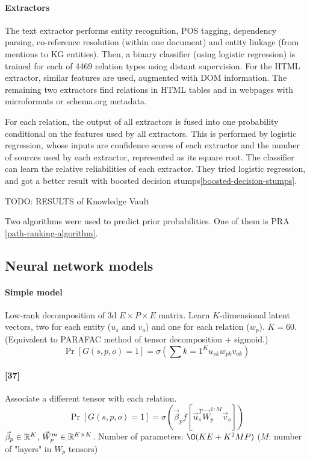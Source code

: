 \paragraph{Extractors}
The text extractor performs entity recognition, POS tagging, dependency parsing,
co-reference resolution (within one document) and entity linkage (from mentions
to KG entities).
Then, a binary classifier (using logistic regression) is trained for each of
4469 relation types using distant supervision.
For the HTML extractor, similar features are used, augmented with DOM
information.
The remaining two extractors find relations in HTML tables and in webpages
with microformats or schema.org metadata.

For each relation, the output of all extractors is fused into one probability
conditional on the features used by all extractors. This is performed by
logistic regression, whose inputs are confidence scores of each extractor and
the number of sources used by each extractor, represented as its square root.
The classifier can learn the relative reliabilities of each extractor.
They tried logistic regression, and got a better result with boosted decision
stumps\ref{boosted-decision-stumps}.

TODO: RESULTS of Knowledge Vault

Two algorithms were used to predict prior probabilities.
One of them is PRA \ref{path-ranking-algorithm}.

\subsection{Neural network models}

\paragraph{Simple model}
Low-rank decomposition of 3d $E\times P\times E$ matrix. Learn $K$-dimensional
latent vectors, two for each entity ($u_s$ and $v_o$) and one for each relation
($w_p$). $K=60$. (Equivalent to PARAFAC method of tensor decomposition +
sigmoid.)
$$\Pr[G(s,p,o)=1] = \sigma(\sum\limits{k=1}^K u_{sk} w_{pk} v_{ok})$$

\paragraph{[37]}
Associate a different tensor with each relation.
$$\Pr[G(s,p,o)=1] = \sigma(\vec{\beta}_p f[\vec{u}_s^T \vec{W}_p^{1:M} \vec{v}_o])$$
$\vec{\beta}_p\in\mathbb{R}^K$, $\vec{W}_p^m\in\mathbb{R}^{K\times K}$.
Number of parameters: $\O(KE+K^2 MP)$ ($M$: number of "layers" in $W_p$ tensors)

